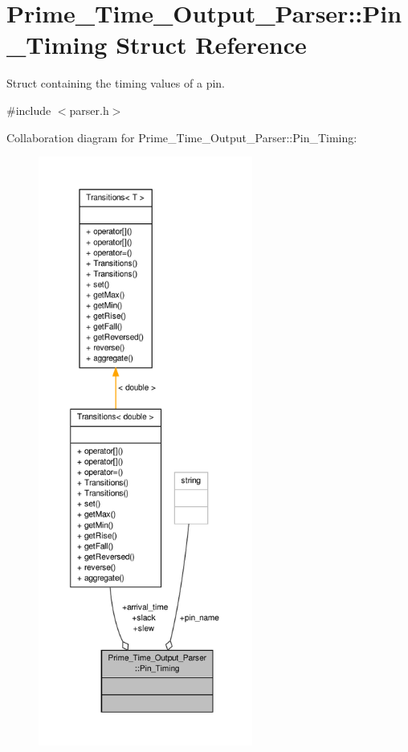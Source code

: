 \hypertarget{structPrime__Time__Output__Parser_1_1Pin__Timing}{\section{Prime\-\_\-\-Time\-\_\-\-Output\-\_\-\-Parser\-:\-:Pin\-\_\-\-Timing Struct Reference}
\label{structPrime__Time__Output__Parser_1_1Pin__Timing}
}


Struct containing the timing values of a pin.  




{\ttfamily \#include $<$parser.\-h$>$}



Collaboration diagram for Prime\-\_\-\-Time\-\_\-\-Output\-\_\-\-Parser\-:\-:Pin\-\_\-\-Timing\-:\nopagebreak
\begin{figure}[H]
\begin{center}
\leavevmode
\includegraphics[height=550pt]{structPrime__Time__Output__Parser_1_1Pin__Timing__coll__graph}
\end{center}
\end{figure}
